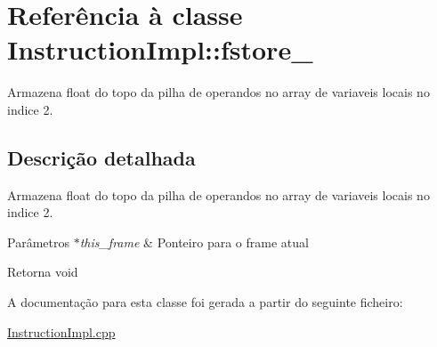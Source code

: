 \hypertarget{class_instruction_impl_1_1fstore__2}{}\section{Referência à classe Instruction\+Impl\+:\+:fstore\+\_}
\label{class_instruction_impl_1_1fstore__2}


Armazena float do topo da pilha de operandos no array de variaveis locais no indice 2.  




\subsection{Descrição detalhada}
Armazena float do topo da pilha de operandos no array de variaveis locais no indice 2. 


\begin{DoxyParams}{Parâmetros}
{\em $\ast$this\+\_\+frame} & Ponteiro para o frame atual \\
\hline
\end{DoxyParams}
\begin{DoxyReturn}{Retorna}
void 
\end{DoxyReturn}


A documentação para esta classe foi gerada a partir do seguinte ficheiro\+:\begin{DoxyCompactItemize}
\item 
\hyperlink{_instruction_impl_8cpp}{Instruction\+Impl.\+cpp}\end{DoxyCompactItemize}
